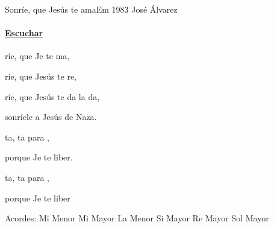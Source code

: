 \documentclass[12pt, spanish]{book}
\newcommand{\NotCCLIed}{\relax}
\begin{document}
    \begin{song}{Sonríe, que Jesús te ama}{Em}
        {1983} %
        {José Álvarez}
        {} %
        {} %
        \ifChordBk
        \paragraph{\mbox{}\hfill\protect\href{https://open.spotify.com/intl-es/track/2EM87OhdmwkaXNe5BJHa2z}{Escuchar}\mbox{}\hfill}
        \fi


        \begin{SBOpGroup}
            ríe, que Je te ma,

            ríe, que Jesús te re,

            ríe, que Jesús te da la da,

            sonríele a Jesús de Naza.
        \end{SBOpGroup}

        \begin{SBChorus}
            ta, ta para ,

            porque Je te liber.

            ta, ta para ,

            porque Je te liber
        \end{SBChorus}

        \ifChordBk
        \begin{SBOpGroup}
            Acordes:\break
            \upchord{\Em}\qquad Mi Menor \hfill
            \upchord{\E}\qquad Mi Mayor \hfill\null\break
            \upchord{\Am}\qquad La Menor \hfill
            \upchord{\B}\qquad Si Mayor \hfill\null\break
            \upchord{\D}\qquad Re Mayor \hfill
            \upchord{\G}\qquad Sol Mayor \hfill\null\break
        \end{SBOpGroup}
        \fi
    \end{song}
\end{document}

